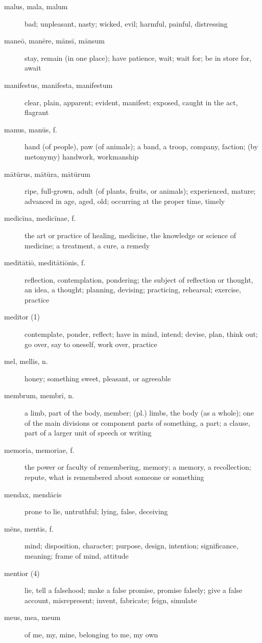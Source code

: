 \begin{description}
    \item[malus, mala, malum] bad; unpleasant, nasty; wicked, evil; harmful, painful, distressing
    \item[maneō, manēre, mānsī, mānsum] stay, remain (in one place); have patience, wait; wait for; be in store for, await
    \item[manifestus, manifesta, manifestum] clear, plain, apparent; evident, manifest; exposed, caught in the act, flagrant
    \item[manus, manūs, f.] hand (of people), paw (of animals); a band, a troop, company, faction; (by metonymy) handwork, workmanship
    \item[mātūrus, mātūra, mātūrum] ripe, full-grown, adult (of plants, fruits, or animals); experienced, mature; advanced in age, aged, old; occurring at the proper time, timely
    \item[medicīna, medicīnae, f.] the art or practice of healing, medicine, the knowledge or science of medicine; a treatment, a cure, a remedy
    \item[meditātiō, meditātiōnis, f.] reflection, contemplation, pondering; the subject of reflection or thought, an idea, a thought; planning, devising; practicing, rehearsal; exercise, practice
    \item[meditor (1)] contemplate, ponder, reflect; have in mind, intend; devise, plan, think out; go over, say to oneself, work over, practice
    \item[mel, mellis, n.] honey; something sweet, pleasant, or agreeable
    \item[membrum, membrī, n.] a limb, part of the body, member; (pl.) limbs, the body (as a whole); one of the main divisions or component parts of something, a part; a clause, part of a larger unit of speech or writing
    \item[memoria, memoriae, f.] the power or faculty of remembering, memory; a memory, a recollection; repute, what is remembered about someone or something
    \item[mendax, mendācis] prone to lie, untruthful; lying, false, deceiving
    \item[mēns, mentis, f.] mind; disposition, character; purpose, design, intention; significance, meaning; frame of mind, attitude
    \item[mentior (4)] lie, tell a falsehood; make a false promise, promise falsely; give a false account, misrepresent; invent, fabricate; feign, simulate
    \item[meus, mea, meum] of me, my, mine, belonging to me, my own

\end{description}
